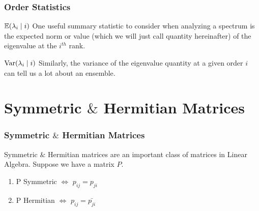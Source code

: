 
\begin{frame} \frametitle{Order Statistics}

 $\mathbb{E}(\lambda_{i} \mid i)$ One useful summary statistic to consider when analyzing a spectrum is the expected norm or value (which we will just call quantity hereinafter) of the eigenvalue at the $i^{th}$ rank.

\medskip

 $\text{Var}(\lambda_{i} \mid i)$ Similarly, the variance of the eigenvalue quantity at a given order $i$ can tell us a lot about an ensemble.

\end{frame}






\section{Symmetric $\&$ Hermitian Matrices}

\begin{frame} \frametitle{Symmetric $\&$ Hermitian Matrices}

Symmetric $\&$ Hermitian matrices are an important class of matrices in Linear Algebra.
Suppose we have a matrix $P$.

\begin{enumerate}
  \item P Symmetric $\iff$ $p_{ij} = p_{ji}$
  \item P Hermitian $\iff$ $p_{ij} = \bar{p_{ji}}$
\end{enumerate}


\end{frame}

